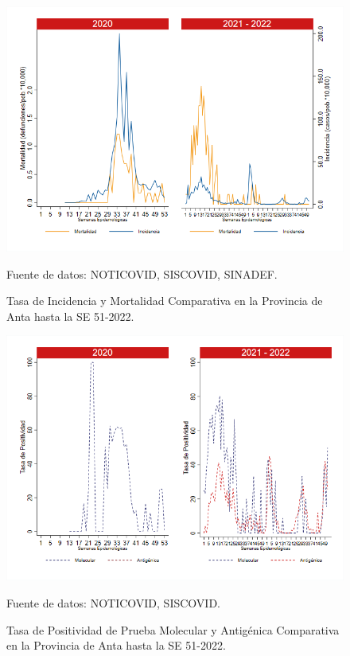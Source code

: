 \documentclass[12pt,a4paper,openany]{book}
\begin{document}
	\begin{figure}[h]
		\caption{Tasa de Incidencia y Mortalidad Comparativa en la Provincia de Anta hasta la SE 51-2022.}\label{fig:inc_mort_anta}
		\begin{center}
			\includegraphics[width=0.85\linewidth]{../figuras/incidencia_mortalidad_20_21_2.png}
		\end{center}
		{\footnotesize {Fuente de datos: NOTICOVID, SISCOVID, SINADEF.}}
	\end{figure}
	
	\begin{figure}[h]
		\caption{Tasa de Positividad de Prueba Molecular y Antigénica Comparativa en la Provincia de Anta hasta la SE 51-2022.}\label{fig:positividad_anta}
		\begin{center}
			\includegraphics[width=0.7\linewidth]{../figuras/positividad_20_21_2.png}
		\end{center}
		{\footnotesize {Fuente de datos: NOTICOVID, SISCOVID.}}
	\end{figure}
	
\end{document}
